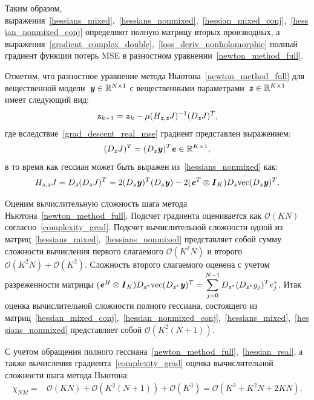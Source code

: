 Таким образом, выражения~\eqref{hessians_mixed},~\eqref{hessians_nonmixed},~\eqref{hessian_mixed_conj},~\eqref{hessian_nonmixed_conj} определяют полную матрицу вторых производных, а выражения~\eqref{gradient_complex_double},~\eqref{loss_deriv_nonholomorphic} полный градиент функции потерь MSE в разностном уравнении~\eqref{newton_method_full}.

Отметим, что разностное уравнение метода Ньютона~\eqref{newton_method_full} для вещественной модели~$\textbf{\textit{y}}\in\mathbb{R}^{N\times1}$ с вещественными параметрами~$\textbf{\textit{z}}\in\mathbb{R}^{K\times1}$ имеет следующий вид:
\begin{equation}
	\textbf{\textit{z}}_{k+1}=\textbf{\textit{z}}_{k}-\mu(H_{\textbf{\textit{z}}, \textbf{\textit{z}}}J)^{-1}(D_{\textbf{\textit{z}}}J)^T,
	\label{newton_method_real}
\end{equation}
где вследствие~\eqref{grad_descent_real_mse} градиент представлен выражением:
\begin{equation}
	(D_{\textbf{\textit{z}}}J)^T=(D_{\textbf{\textit{z}}}\textbf{\textit{y}})^T\textbf{\textit{e}}\in\mathbb{R}^{K\times1},
	\label{grad_real}
\end{equation}
в то время как гессиан может быть выражен из~\eqref{hessians_nonmixed} как:
\begin{equation}
		H_{\textbf{\textit{z}}, \textbf{\textit{z}}}J=D_{\textbf{\textit{z}}}(D_{\textbf{\textit{z}}}J)^T=
	2(D_{\textbf{\textit{z}}}\textbf{\textit{y}})^T(D_{\textbf{\textit{z}}}\textbf{\textit{y}})-
	2(\textbf{\textit{e}}^T\otimes\textbf{\textit{I}}_{K})D_{\textbf{\textit{z}}}\text{vec}(D_{\textbf{\textit{z}}}\textbf{\textit{y}})^T.
	\label{hessian_real}
\end{equation}

Оценим вычислительную сложность шага метода Ньютона~\eqref{newton_method_full}. Подсчет градиента оценивается как $\mathcal{O}(KN)$ согласно~\eqref{complexity_grad}. Подсчет вычислительной сложности одной из матриц~\eqref{hessians_mixed},~\eqref{hessians_nonmixed} представляет собой сумму сложности вычисления первого слагаемого $\mathcal{O}(K^2N)$ и второго $\mathcal{O}(K^2N)+\mathcal{O}(K^2)$. Сложность второго слагаемого оценена с учетом разреженности матрицы $(\textbf{\textit{e}}^H\otimes\textbf{\textit{I}}_{K})D_{\textbf{\textit{z}}^*}\text{vec}(D_{\textbf{\textit{z}}^*}\textbf{\textit{y}})^T=\displaystyle \sum_{j=0}^{N-1}D_{\textbf{\textit{z}}^*}(D_{\textbf{\textit{z}}^*}y_j)^Te_{j}^*$. Итак оценка вычислительной сложности полного гессиана, состоящего из матриц~\eqref{hessian_mixed_conj},~\eqref{hessian_nonmixed_conj},~\eqref{hessians_mixed},~\eqref{hessians_nonmixed} представляет собой $\mathcal{O}(K^2(N+1))$. 

С учетом обращения полного гессиана~\eqref{newton_method_full},~\eqref{hessian_real}, а также вычисления градиента~\eqref{complexity_grad} оценка вычислительной сложности шага метода Ньютона:
\begin{align}
	\chi_{NM}=&\mathcal{O}(KN)+\mathcal{O}(K^2(N+1))+\mathcal{O}(K^3)=\mathcal{O}(K^3+K^2N+2KN).
	\label{complexity_nm}
\end{align}

